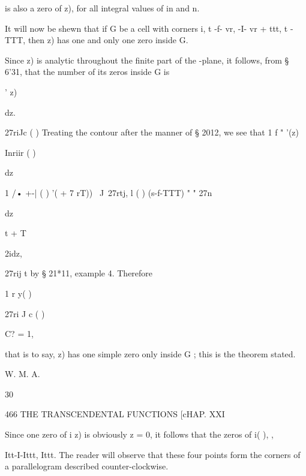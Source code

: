 is also a zero of z), for all integral values of in and n.

It will now be shewn that if G be a cell with corners i, t -f- vr, -I-
vr + ttt, t - TTT, then z) has one and only one zero inside G.

Since z) is analytic throughout the finite part of the -plane, it
follows, from § 6'31, that the number of its zeros inside G is



 ' z)



dz.



27riJc ( ) Treating the contour after the manner of § 2012, we see
that 1 f " '(z)



Inriir ( )



dz



1 /• +-| ( ) '( + 7 rT)) \ J\ 27rtj, l ( ) (s-f-TTT) " " 27n






dz



t + T



2idz,



27rij t by § 21*11, example 4. Therefore

1 r y( )



27ri J c ( )



C? = 1,



that is to say, z) has one simple zero only inside G ; this is the
theorem stated.



W. M. A.



30



466 THE TRANSCENDENTAL FUNCTIONS [cHAP. XXI

Since one zero of i z) is obviously z = 0, it follows that the zeros
of i( ), %
,

Itt-I-Ittt, Ittt. The reader will observe that these four points form
the corners of a parallelogram described counter-clockwise.

